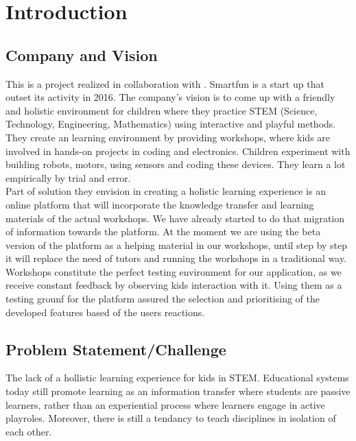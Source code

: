 
\chapter{Introduction}

\section{Company and Vision}

This is a project realized in collaboration with \sfun. 
Smartfun is a start up that outset its activity in 2016. The company's vision is to 
come up with a friendly and holistic environment for children where they practice STEM (Science, Technology, Engineering, Mathematics) using interactive and playful methods. \\

They create an learning environment by providing workshops, where kids are involved in hands-on projects in coding and electronics. Children experiment with building robots, motors, using sensors and coding these devices. They learn a lot empirically by trial and error.  \\

Part of solution they envision in creating a holistic learning experience is an online platform that will incorporate the knowledge transfer and learning materials of the actual workshops. We have already started to do that migration of information towards the platform. At the moment we are using the beta version of the platform as a helping material in our workshops, until step by step it will replace the need of tutors and running the workshops in a traditional way. \\

Workshops constitute the perfect testing environment for our application, as we receive constant feedback by observing kids interaction with it. Using them as a testing grounf for the platform assured the selection and prioritising of the developed features based of the users reactions.


\section{Problem Statement/Challenge}

The lack of a hollistic learning experience for kids in STEM.
Educational systems today still promote learning as an information transfer where students are passive learners, rather than an experiential process where learners engage in active playroles. Moreover, there is still a tendancy to teach disciplines in isolation of each other.\\

